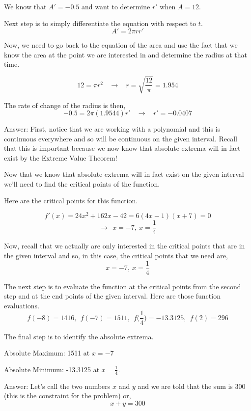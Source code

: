 \documentclass{article}
\begin{document}
\begin{description}[style=nextline]
We know that $A' = -0.5$ and want to determine $r'$ when $A = 12$.

Next step is to simply differentiate the equation with respect to $t$.
$$A' = 2\pi rr'$$

Now, we need to go back to the equation of the area and use the fact that we know the area at the point we are interested in and determine the radius at that time.

$$12 = \pi r^2 \ \ \ \ \rightarrow \ \ \ \ r = \sqrt{\frac{12}{\pi}} = 1.954$$

The rate of change of the radius is then,
$$-0.5 = 2\pi (1.9544)r' \ \ \ \ \rightarrow \ \ \ \ r' = -0.0407$$

\item[Question 11: Determine the absolute extrema of $f(x) = 8x^3 + 81x^2 - 42x - 8$ on $\{-8, 2\}$.]
Answer: First, notice that we are working with a polynomial and this is continuous everywhere and so will be continuous on the given interval. Recall that this is important because we now know that absolute extrema will in fact exist by the Extreme Value Theorem!

Now that we know that absolute extrema will in fact exist on the given interval we'll need to find the critical points of the function.

Here are the critical points for this function.

$$f'(x) = 24 x^2 + 162x - 42 = 6(4x-1)(x+7) = 0$$
$$\rightarrow \ \ x = -7,\ x = \frac{1}{4}$$

Now, recall that we actually are only interested in the critical points that are in the given interval and so, in this case, the critical points that we need are,
$$x = -7,\ x = \frac{1}{4}$$

The next step is to evaluate the function at the critical points from the second step and at the end points of the given interval. Here are those function evaluations.
$$f(-8) = 1416, \ \ f(-7) = 1511, \ \ f\big(\frac{1}{4}\big) = -13.3125, \ \ f(2) = 296$$

The final step is to identify the absolute extrema.

Absolute Maximum: 1511 at $x = -7$

Absolute Minimum: -13.3125 at $x = \frac{1}{4}.$

\item[Question 12: Find two positive numbers whose sum is 300 and whose product is a maximum.]
Answer: Let's call the two numbers $x$ and $y$ and we are told that the sum is 300 (this is the constraint for the problem) or, 
$$x + y = 300$$


\end{description}
\end{document}
